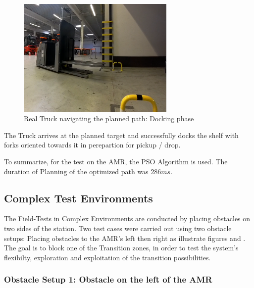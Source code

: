\begin{figure}[H]
    \begin{center}
        \includegraphics[width=3in]{images/Chap3/Test1_real_dock.png} %
        \caption{Real Truck navigating the planned path: Docking phase}
        \label{OptResult11}
        \end{center}    
\end{figure}

The Truck arrives at the planned target and successfully 
docks the shelf with forks oriented towards it in perepartion for
pickup / drop.

To summarize, for the test on the AMR, the PSO Algorithm is used. The duration of Planning of the optimized 
path was \(286ms\). 



\subsection{Complex Test Environments}
The Field-Tests in Complex Environments are conducted by placing obstacles on two sides of the 
station. 
Two test cases were carried out using two obstacle setups: Placing obstacles to the AMR's left then right
as illustrate figures  and . %
The goal is to block one of the Transition zones, in order to test the system's flexibilty,
exploration and exploitation of the transition possibilities.



\subsubsection{Obstacle Setup 1: Obstacle on the left of the AMR}

